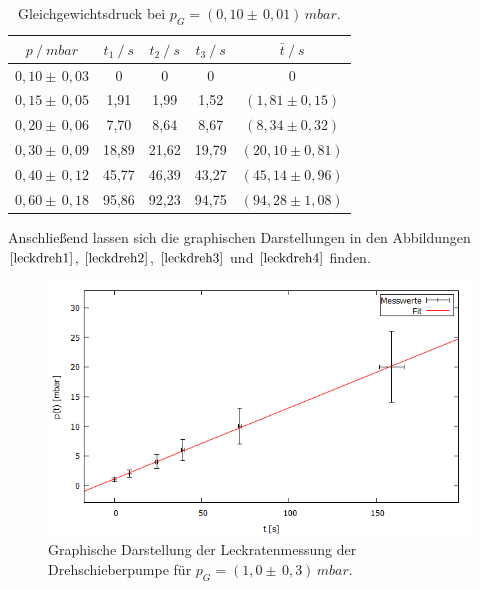 \begin{table}[H]
\centering
\begin{tabular}{c|c|c|c|c}
	{$p \:/\: \si{mbar}$} & {$t_1 \:/\: \si{s} $} & {$t_2 \:/\: \si{s} $} & {$t_3 \:/\: \si{s} $} & {$\bar{t} \:/\: \si{s}$}\\
\midrule
$0,10 \pm \, 0,03$ &0 &0 &0 &0\\
$0,15 \pm \, 0,05$ &   1,91 &  1,99 &  1,52 & $(1,81 \pm 0,15)$\\
$0,20 \pm \, 0,06$ &   7,70  &  8,64 &  8,67 & $(8,34 \pm 0,32) $\\
$0,30 \pm \, 0,09$ &   18,89 &  21,62 &  19,79 & $(20,10 \pm 0,81) $\\
$0,40 \pm \, 0,12$ &   45,77 &  46,39 & 43,27 & $(45,14 \pm 0,96) $\\
$0,60 \pm \, 0,18$ &   95,86 &  92,23 &  94,75 & $(94,28 \pm 1,08) $\\
\end{tabular}
\caption{Gleichgewichtsdruck bei $p_G=(0,10 \pm \, 0,01) \, \si{mbar}$.}
\label{tab:leck_Dreh4}
\end{table}
Anschließend lassen sich die graphischen Darstellungen in den Abbildungen $\ref{leckdreh1}$, $\ref{leckdreh2}$, $\ref{leckdreh3}$ und $\ref{leckdreh4}$ finden.
\begin{figure}[H]
  \centering
  \includegraphics[width=14cm]{bilder/leckdrehfit1.png}
	\caption{Graphische Darstellung der Leckratenmessung der Drehschieberpumpe für $p_G=(1,0 \pm \, 0,3)  \, \si{mbar}$.}
  \label{leckdreh1}
\end{figure}
